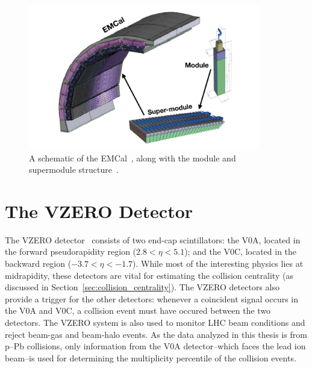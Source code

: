 \begin{figure}
    \centering
    \includegraphics[width=0.9\textwidth]{figures/experiment/emcal_schematic.png}
    \caption{A schematic of the EMCal~\cite{ERIN123}, along with the module and supermodule structure~\cite{ERIN124}.}
    \label{fig:emcal_schematic}
\end{figure}

\section{The VZERO Detector}

The VZERO detector~\cite{VZERO} consists of two end-cap scintillators: the V0A, located in the forward pseudorapidity region ($2.8 < \eta < 5.1$); and the V0C, located in the backward region ($-3.7 < \eta < -1.7$). While most of the interesting physics lies at midrapidity, these detectors are vital for estimating the collision centrality (as discussed in Section~\ref{sec:collision_centrality}). The VZERO detectors also provide a trigger for the other detectors: whenever a coincident signal occurs in the V0A and V0C, a collision event must have occured between the two detectors. The VZERO system is also used to monitor LHC beam conditions and reject beam-gas and beam-halo events. As the data analyzed in this thesis is from p--Pb collisions, only information from the V0A detector--which faces the lead ion beam--is used for determining the multiplicity percentile of the collision events.